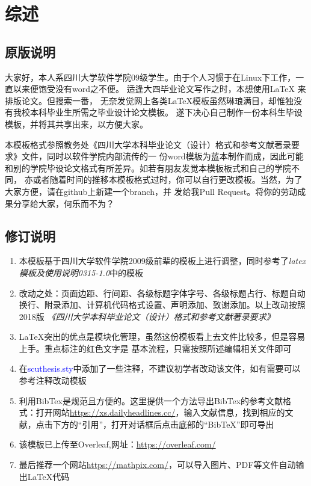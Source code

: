 	\chapter{综述}
	
	
	\section{原版说明}
	大家好，本人系四川大学软件学院09级学生。由于个人习惯于在Linux下工作，一直以来便饱受没有word之不便。
	适逢大四毕业论文写作之时，本想使用\LaTeX{} 来排版论文。但搜索一番，
	无奈发觉网上各类\LaTeX 模板虽然琳琅满目，却惟独没有我校本科毕业生所需之毕业设计论文模板。
	遂下决心自己制作一份本科生毕设模板，并将其共享出来，以方便大家。

	本模板格式参照教务处《四川大学本科毕业论文（设计）格式和参考文献著录要求》文件，同时以软件学院内部流传的一
	份word模板为蓝本制作而成，因此可能和别的学院毕设论文格式有所差异。如若有朋友发觉本模板板式和自己的学院不同，
	亦或者随着时间的推移本模板格式过时，你可以自行更改模板。当然，为了大家方便，请在github上新建一个branch，并
	发给我Pull Request。将你的劳动成果分享给大家，何乐而不为？
	
	
	\section{修订说明}
	
	\begin{enumerate}
		\item 本模板基于四川大学软件学院2009级前辈的模板上进行调整，同时参考了\textit{latex模板及使用说明0315-1.0}中的模板
		\item
		改动之处：页面边距、行间距、各级标题字体字号、各级标题占行、标题自动换行、附录添加、计算机代码格式设置、声明添加、致谢添加。以上改动按照2018版
		\textit{《四川大学本科毕业论文（设计）格式和参考文献著录要求》}
		\item 
		\LaTeX 突出的优点是模块化管理，虽然这份模板看上去文件比较多，但是容易上手。重点标注的红色文字是
		基本流程，只需按照\textcolor{red}{}所述编辑相关文件即可
		\item
		在\textcolor{blue}{scuthesis.sty}中添加了一些注释，不建议初学者改动该文件，如有需要可以参考注释改动模板
		\item
		利用BibTex是规范且方便的。这里提供一个方法导出BibTex的参考文献格式：打开网站\textcolor{green}{\url{https://xs.dailyheadlines.cc/}}，输入文献信息，找到相应的文献，点击下方的“引用”，打开对话框后点击底部的“BibTeX”即可导出
		\item
		该模板已上传至Overleaf,网址：\textcolor{green}{\url{https://overleaf.com/}}
		\item 
		最后推荐一个网站\textcolor{green}{\url{https://mathpix.com/}}，可以导入图片、PDF等文件自动输出\LaTeX 代码
		
	\end{enumerate}
	
	
	